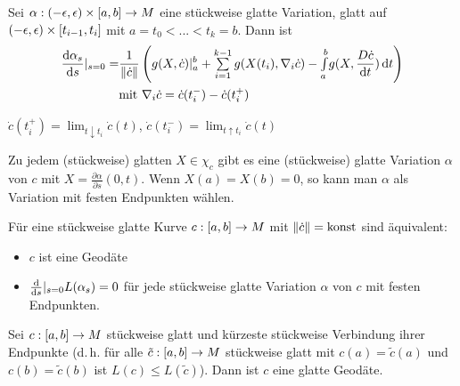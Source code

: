 \documentclass{cheat-sheet}
\newcommand{\vinterval}{\ointerval{-\epsilon}{\epsilon}} %
\newcommand{\abinterval}{\cinterval{a}{b}} %
\begin{document}

\begin{satz}
  Sei $\alpha : \vinterval \times \abinterval \to M$ eine stückweise glatte Variation, glatt auf $\vinterval \times \cinterval{t_{i-1}}{t_i}$ mit $a = t_0 < ... < t_k = b$. Dann ist
  \begin{align*}
    \frac{\d \alpha_s}{\d s} |_{s=0} = & \frac{1}{\norm{\dot{c}}} \left( g(X, \dot{c})|_a^b + \sum_{i=1}^{k-1} g(X(t_i), \nabla_i \dot{c}) - \Int{a}{b}{g(X, \frac{D \dot{c}}{\d t})}{t} \right) \\
    & \text{mit } \nabla_i \dot{c} = \dot{c}(t_i^-) - \dot{c}(t_i^+)
  \end{align*}
\end{satz}

\begin{nota}
  $\dot{c}(t_i^+) = \lim_{t \downarrow t_i} \dot{c}(t)$, \enspace
  $\dot{c}(t_i^-) = \lim_{t \uparrow t_i} \dot{c}(t)$
\end{nota}

\begin{satz}
  Zu jedem (stückweise) glatten $X \in \chi_c$ gibt es eine (stückweise) glatte Variation $\alpha$ von $c$ mit $X = \tfrac{\partial \alpha}{\partial s} (0, t)$. Wenn $X(a) = X(b) = 0$, so kann man $\alpha$ als Variation mit festen Endpunkten wählen.
\end{satz}

\begin{satz}
  Für eine stückweise glatte Kurve $c : \abinterval \to M$ mit $\lVert\dot{c}\rVert = \text{konst}$ sind äquivalent:
  \begin{itemize}
    \item $c$ ist eine Geodäte
    \item $\tfrac{\mathrm{d}}{\mathrm{d} s}|_{s=0} L(\alpha_s) = 0$ für jede stückweise glatte Variation $\alpha$ von $c$ mit festen Endpunkten.
  \end{itemize}
\end{satz}


\begin{kor}
  Sei $c : \abinterval \to M$ stückweise glatt und kürzeste stückweise Verbindung ihrer Endpunkte (d.\,h. für alle $\tilde{c} : \abinterval \to M$ stückweise glatt mit $c(a) = \tilde{c}(a)$ und $c(b) = \tilde{c}(b)$ ist $L(c) \leq L(\tilde{c})$). Dann ist $c$ eine glatte Geodäte.
\end{kor}
\end{document}
